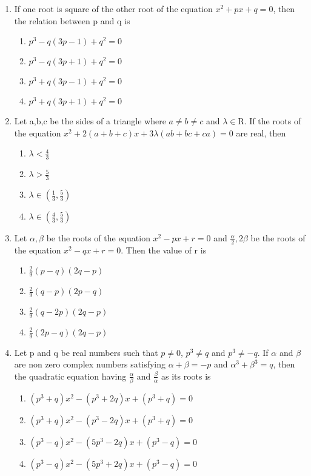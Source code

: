\begin{enumerate}[label=\arabic*.,ref=\thesubsection.\theenumi]
\item If one root is square of the other root of the equation $x^{2}+px+q=0$, then the relation between p and q is
\begin{enumerate}
\item $p^{3}-q(3p-1)+q^{2}=0$
\item $p^{3}-q(3p+1)+q^{2}=0$
\item $p^{3}+q(3p-1)+q^{2}=0$
\item $p^{3}+q(3p+1)+q^{2}=0$ 
\end{enumerate}

\item Let a,b,c be the sides of a triangle where ${a}\neq{b}\neq{c}$ and $\lambda \in$R. If the roots of the equation $x^{2}+2(a+b+c)x+3\lambda(ab+bc+ca)=0$ are real, then
\begin{enumerate}
\item $\lambda<\frac{4}{3}$
\item $\lambda>\frac{5}{3}$
\item $\lambda\in(\frac{1}{3},\frac{5}{3})$ 
\item $\lambda\in(\frac{4}{3},\frac{5}{3})$
\end{enumerate}

\item Let $\alpha, \beta$ be the roots of the equation $x^{2}-px+r=0$ and $\frac{\alpha}{2},2\beta$ be the roots of the equation $x^{2}-qx+r=0$. Then the value of r is
\begin{enumerate}
\item $\frac{2}{9}(p-q)(2q-p)$
\item $\frac{2}{9}(q-p)(2p-q)$
\item $\frac{2}{9}(q-2p)(2q-p)$
\item $\frac{2}{9}(2p-q)(2q-p)$ 
\end{enumerate}

\item Let p and q be real numbers such that $p\neq0$, $p^{3}\neq{q}$ and $p^{3}\neq-q$. If $\alpha$ and $\beta$ are non zero complex numbers satisfying $\alpha+\beta=-p$ and $\alpha^{3}+\beta^{3}=q$, then the quadratic equation having $\frac{\alpha}{\beta}$ and $\frac{\beta}{\alpha}$ as its roots is 
\begin{enumerate}
\item $(p^{3}+q)x^{2}-(p^{3}+2q)x+(p^{3}+q)=0$
\item $(p^{3}+q)x^{2}-(p^{3}-2q)x+(p^{3}+q)=0$ 
\item $(p^{3}-q)x^{2}-(5p^{3}-2q)x+(p^{3}-q)=0$
\item $(p^{3}-q)x^{2}-(5p^{3}+2q)x+(p^{3}-q)=0$ 
\end{enumerate}


\end{enumerate}
